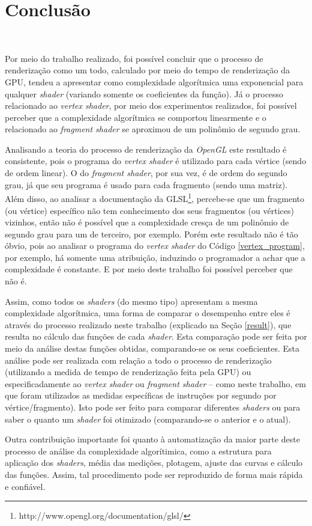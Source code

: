 \chapter[Conclusao]{Conclusão}\

	Por meio do trabalho realizado, foi possível concluir que o processo de renderização como um todo, calculado por meio do tempo de renderização da GPU, tendeu a apresentar como complexidade algorítmica uma exponencial para qualquer \textit{shader} (variando somente os coeficientes da função).  Já o processo relacionado ao \textit{vertex shader}, por meio dos experimentos realizados, foi possível perceber que a complexidade algorítmica se comportou linearmente e o relacionado ao \textit{fragment shader} se aproximou de um polinômio de segundo grau.

	Analisando a teoria do processo de renderização da \textit{OpenGL} este resultado é consistente, pois o programa do \textit{vertex shader} é utilizado para cada vértice (sendo de ordem linear).  O do \textit{fragment shader}, por sua vez, é de ordem do segundo grau, já que seu programa é usado para cada fragmento (sendo uma matriz). Além disso, ao analisar a documentação da GLSL\footnote{http://www.opengl.org/documentation/glsl/}, percebe-se que um fragmento (ou vértice) específico não tem conhecimento dos seus fragmentos (ou vértices) vizinhos, então não é possível que a complexidade cresça de um polinômio de segundo grau para um de terceiro, por exemplo. Porém este resultado não é tão óbvio, pois ao analisar o programa do \textit{vertex shader} do Código \ref{vertex_program}, por exemplo, há somente uma atribuição, induzindo o programador  a achar que a complexidade é constante. E por meio deste trabalho foi possível perceber que não é.

	 
	
	Assim, como todos os \textit{shaders} (do mesmo tipo) apresentam a mesma complexidade algorítmica, uma forma de comparar o desempenho entre eles é através do processo realizado neste trabalho (explicado na Seção \ref{result}), que resulta no cálculo das funções de cada \textit{shader}. Esta comparação pode ser feita por meio da análise destas funções obtidas, comparando-se os seus coeficientes. Esta análise pode ser realizada com relação a todo o processo de renderização (utilizando a medida de tempo de renderização feita pela GPU) ou especificadamente ao \textit{vertex shader} ou \textit{fragment shader} -- como neste trabalho, em que foram utilizados as medidas específicas de instruções por segundo por vértice/fragmento).  Isto pode ser feito para comparar diferentes \textit{shaders} ou para saber o quanto um \textit{shader} foi otimizado (comparando-se o anterior e o atual). 

	Outra contribuição importante foi quanto à automatização da maior parte deste processo de análise da complexidade algorítimica, como a estrutura para aplicação dos \textit{shaders}, média das medições, plotagem, ajuste das curvas e cálculo das funções. Assim, tal procedimento pode ser reproduzido de forma mais rápida e confiável. 
